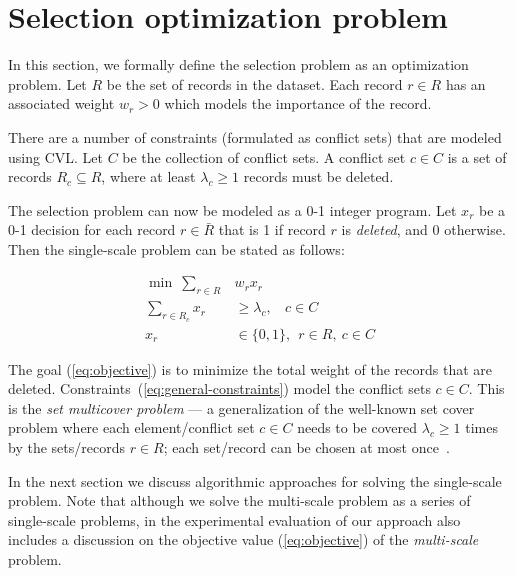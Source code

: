 \section{Selection optimization problem}
\label{sec:optimizationmodel}

In this section, we formally define the selection problem as an optimization problem. Let $R$ be the set of records in the dataset. Each record $r \in R$ has an associated weight $w_r > 0$ which models the importance of the record. 

There are a number of constraints (formulated as conflict sets) that are modeled using CVL. Let $C$ be the collection of conflict sets. A conflict set $c \in C$ is a set of records $R_c \subseteq R$, where at least $\lambda_c \geq 1$ records must be deleted. 

The selection problem can now be modeled as a 0-1 integer program. Let $x_r$ be a 0-1 decision for each record $r \in \bar{R}$ that is 1 if record $r$ is \emph{deleted}, and 0 otherwise. Then the single-scale problem can be stated as follows:

\begin{align}
  \label{eq:objective}
  \min ~\sum_{r \in R} &w_r x_r \\
  \label{eq:general-constraints}
  \sum_{r \in R_c} x_r &\geq \lambda_c, ~~~~ c \in C \\
  x_r & \in \{0, 1\}, ~~ r \in R, ~c \in C
\end{align}

The goal (\ref{eq:objective}) is to minimize the total weight of the records that are deleted. Constraints~(\ref{eq:general-constraints}) model the conflict sets $c \in C$. This is the \emph{set multicover problem} --- a generalization of the well-known set cover problem where each element/conflict set $c \in C$ needs to be covered $\lambda_c \geq 1$ times by the sets/records $r \in R$; each set/record can be chosen at most once~\cite{rajagopalan1998primal}.

In the next section we discuss algorithmic approaches for solving the single-scale problem. Note that although we solve the multi-scale problem as a series of single-scale problems, in the experimental evaluation of our approach also includes a discussion on the objective value (\ref{eq:objective}) of the \emph{multi-scale} problem. 